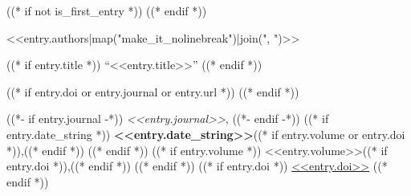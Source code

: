 ((* if not is_first_entry *))
\vspace{<<design.margins.entry_area.vertical_between>>}
((* endif *))

\begin{samepage}

    \vspace{<<design.margins.highlights_area.top>>}
    
    \begin{onecolentry}
        <<entry.authors|map("make_it_nolinebreak")|join(", ")>>

        ((* if entry.title *))
        \vspace{<<design.margins.highlights_area.vertical_between_bullet_points>>}
        ``<<entry.title>>''
        ((* endif *))

        ((* if entry.doi or entry.journal or entry.url *))
        \vspace{<<design.margins.highlights_area.vertical_between_bullet_points>>}
        ((* endif *))

        ((*- if entry.journal -*))
        \textit{<<entry.journal>>},
        ((*- endif -*))
        ((* if entry.date_string *))
        \textbf{<<entry.date_string>>}((* if entry.volume or entry.doi  *)),((* endif *))
        ((* endif *))
        ((* if entry.volume *))
        <<entry.volume>>((* if entry.doi *)),((* endif *))
        ((* endif *))
        ((* if entry.doi *))
        \href{https://doi.org/<<entry.doi>>}{<<entry.doi>>}
        ((* endif *))
    \end{onecolentry}
\end{samepage}
